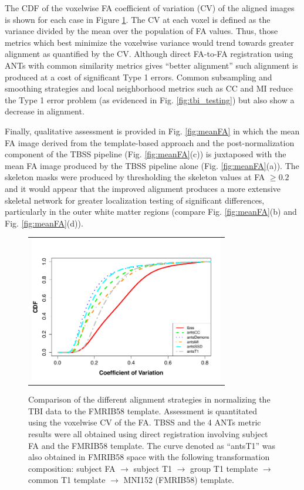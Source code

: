 \documentclass[final,5p,times,twocolumn]{elsarticle}
\begin{document}
The CDF of the voxelwise FA coefficient of variation (CV) of the aligned
images is shown for each case in Figure \ref{fig:tbi_cov}.  
The CV at each voxel is defined as the variance
divided by the mean over the population of FA values.  Thus,
those metrics which best minimize the voxelwise variance would
trend towards greater alignment as quantified by the CV.
Although direct FA-to-FA registration using ANTs with common
similarity metrics gives ``better alignment'' such alignment is 
produced at a cost of significant Type 1 errors.  Common subsampling and
smoothing strategies and local neighborhood metrics such as CC and MI reduce the 
Type 1 error problem (as evidenced in Fig. \ref{fig:tbi_testing}) 
but also show a decrease in alignment.  

Finally, qualitative assessment is provided in Fig. \ref{fig:meanFA} 
in which the mean FA image derived from the template-based approach
and the post-normalization component of the TBSS pipeline (Fig. \ref{fig:meanFA}(c)) 
is juxtaposed 
with the mean FA image produced by the TBSS pipeline alone (Fig. \ref{fig:meanFA}(a)).
The skeleton masks were produced by thresholding the skeleton values at 
FA $\geq 0.2$ and it would appear that the improved alignment produces 
a more extensive skeletal network for greater localization testing of 
significant differences, particularly in the outer white matter regions
(compare Fig. \ref{fig:meanFA}(b) and Fig. \ref{fig:meanFA}(d)).



\begin{figure}
  \begin{center}
\begin{tabular}{c}
  \includegraphics[width=85mm]{tbiCoV.pdf}
\end{tabular}
\caption{Comparison of the different alignment strategies in normalizing the TBI data to the FMRIB58 template.  Assessment is quantitated using the voxelwise CV of the FA.  TBSS and the 4 ANTs metric
results were all obtained using direct registration involving subject FA and the FMRIB58 template.  The curve denoted as ``antsT1'' was also obtained in FMRIB58 space with the following transformation composition: subject FA $\rightarrow$ subject T1 $\rightarrow$ group T1 template $\rightarrow$ 
common T1 template $\rightarrow$ MNI152 (FMRIB58) template. }
\label{fig:tbi_cov}
\end{center}
\end{figure}
\end{document}
